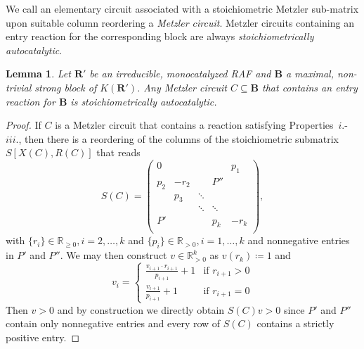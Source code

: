 \documentclass[pdflatex]{sn-jnl}
\theoremstyle{thmstyleone}%
\newtheorem{lemma}[theorem]{Lemma}%
\theoremstyle{examplesty}%
\theoremstyle{thmstylethree}%
\newcommand{\king}{K}
\newcommand{\SM}{S}
\newcommand{\RAF}[0]{\mathbf{R}'}
\newcommand{\block}[0]{\mathbf{B}}
\newcommand{\holy}[1]{\begingroup\color{royalpurple}#1\endgroup}
\begin{document}
\vspace{6pt}

\holy{

We call an elementary circuit associated with a stoichiometric Metzler sub-matrix upon suitable column reordering a \emph{Metzler circuit}. Metzler circuits containing an entry reaction for the corresponding block are always \emph{stoichiometrically autocatalytic}.

\vspace{6pt}
\begin{lemma}\label{lem:MetzCircAut}
  Let $\RAF$ be an irreducible, monocatalyzed RAF and $\block$ a maximal, non-trivial strong block of $\king(\RAF)$. Any Metzler circuit $C\subseteq \block$ that contains an entry reaction for $\block$ is \emph{stoichiometrically autocatalytic}.
\end{lemma}
\begin{proof}
	If $C$ is a Metzler circuit that contains a reaction satisfying Properties~$i.$-$iii.$, then there is a reordering of the columns of the stoichiometric submatrix $\SM[X(C),R(C)]$ that reads
	\begin{equation}
		\SM(C) = 
		\begin{pmatrix}
			0 	& 	 		&	 			&  			& 	p_1	\\
			p_2	& 	-r_2  		& 				&     P''  		&		\\
			& 	p_3  		& 	\ddots 		&      			&		\\
			& 	 		& 	\ddots 		& \ddots 		&    	 	\\
			P'	& 	 		& 				& p_k 		& -r_k     	\\
		\end{pmatrix},
	\end{equation}
	with $\{r_i\}\in \mathbb{R}_{\geq 0}, i=2,\ldots, k$ and $\{p_i\}\in \mathbb{R}_{>0},i=1,\ldots, k$ 
	and nonnegative entries in $P'$ and $P''$. We may then construct $v\in \mathbb{R}^{k}_{>0}$ as $v(r_k)\coloneqq 1$ 
	and 
	\begin{equation}
		v_{i}=\begin{cases}
			\frac{v_{i+1}\cdot r_{i+1}}{p_{i+1}} +1 & \text{if } r_{i+1}>0 \\
			\frac{v_{i+1}}{p_{i+1}} +1 & \text{if } r_{i+1}=0
		\end{cases}
	\end{equation}
	Then $v>0$ and by construction we directly obtain $\SM(C)v>0$ since $P'$ and $P''$ contain only nonnegative entries and every row of $S(C)$ contains a strictly positive entry.
\end{proof}
\vspace{6pt}
}
\end{document}
